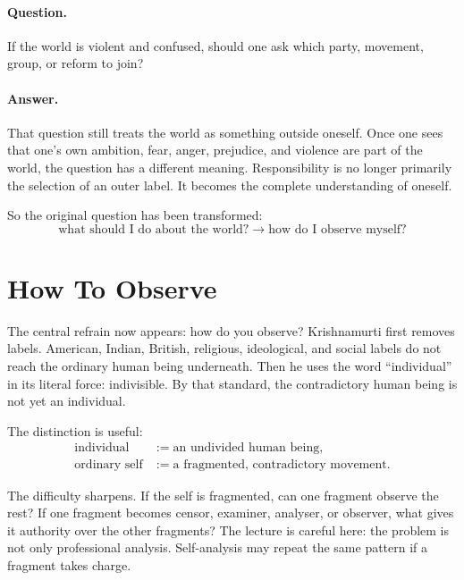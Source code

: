 \paragraph{Question.}
If the world is violent and confused, should one ask which party, movement, group, or reform to join?

\paragraph{Answer.}
That question still treats the world as something outside oneself. Once one sees that one's own ambition, fear, anger, prejudice, and violence are part of the world, the question has a different meaning. Responsibility is no longer primarily the selection of an outer label. It becomes the complete understanding of oneself.

So the original question has been transformed:
\begin{equation}
\text{what should I do about the world?}
\;\longrightarrow\;
\text{how do I observe myself?}
\end{equation}

\section{How To Observe}

The central refrain now appears: how do you observe? Krishnamurti first removes labels. American, Indian, British, religious, ideological, and social labels do not reach the ordinary human being underneath. Then he uses the word ``individual'' in its literal force: indivisible. By that standard, the contradictory human being is not yet an individual.

The distinction is useful:
\begin{align}
\text{individual} &:= \text{an undivided human being},\\
\text{ordinary self} &:= \text{a fragmented, contradictory movement}.
\end{align}

The difficulty sharpens. If the self is fragmented, can one fragment observe the rest? If one fragment becomes censor, examiner, analyser, or observer, what gives it authority over the other fragments? The lecture is careful here: the problem is not only professional analysis. Self-analysis may repeat the same pattern if a fragment takes charge.

